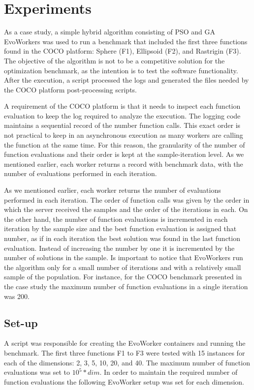 \section{Experiments}
 \label{sec:experiments}
As a case study, a simple hybrid algorithm consisting 
of PSO and GA EvoWorkers was used to run a benchmark that 
included the first three functions found in the COCO platform:  
Sphere (F1), Ellipsoid (F2), and Rastrigin (F3). The objective 
of the algorithm is not to be a competitive solution for 
the optimization benchmark, as the intention is to test 
the software functionality. After the 
execution, a script processed the logs and generated the files 
needed by the COCO platform post-processing scripts. 

A requirement of the COCO platform is that it needs 
to inspect each function evaluation to keep the log required 
to analyze the execution. The logging code maintains 
a sequential record of the number function calls. 
This exact order is not practical to keep in an asynchronous 
execution as many workers are calling the function at the 
same time. For this reason, the granularity of the number of 
function evaluations and their order is kept at the 
sample-iteration level. As we mentioned earlier, each worker 
returns a record with benchmark data, with the number of 
evaluations performed in each iteration.

As we mentioned earlier, each worker returns the number 
of evaluations performed in each iteration. The order 
of function calls was given by the order in which the 
server received the samples and the order of the 
iterations in each. On the other hand, the number of 
function evaluations is incremented in each iteration 
by the sample size and the best function evaluation is 
assigned that number,  as if in each iteration the best 
solution was found in the last function evaluation. Instead 
of increasing the number by one it is incremented by the 
number of solutions in the sample. 
Is important to notice that EvoWorkers run the algorithm 
only for a small number of iterations and with 
a relatively small sample of the population. For instance,
for the COCO benchmark presented in the case study the maximum number of 
function evaluations in a single iteration was 200. 
  

\subsection{Set-up}
\label{sec:setup}

A script was responsible for creating the EvoWorker 
containers and running the benchmark. The first three functions 
F1 to F3 were tested with 15 instances for each of 
the dimensions: 2, 3, 5, 10, 20, and 40. 
The maximum number of function evaluations was set to $10^5*dim$. 
In order to maintain the required number of function 
evaluations the following EvoWorker setup was set for
each dimension.


